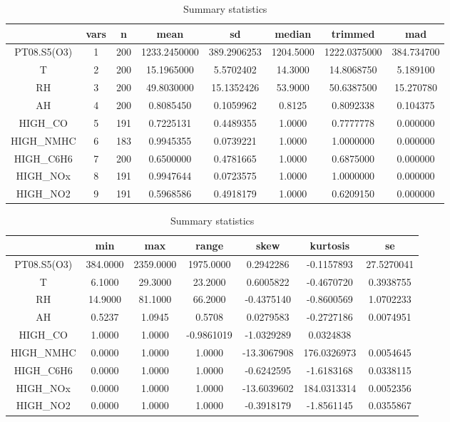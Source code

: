 \begin{table}[h]
  \centering
  \begin{tabular}{|c|c|c|c|c|c|c|c|}
    \hline
    & vars & n & mean & sd & median & trimmed & mad\\
    \hline
    PT08.S5(O3) & 1 & 200 & 1233.2450000 & 389.2906253 & 1204.5000 & 1222.0375000 & 384.734700\\
    \hline
    T & 2 & 200 & 15.1965000 & 5.5702402 & 14.3000 & 14.8068750 & 5.189100\\
    \hline
    RH & 3 & 200 & 49.8030000 & 15.1352426 & 53.9000 & 50.6387500 & 15.270780\\
    \hline
    AH & 4 & 200 & 0.8085450 & 0.1059962 & 0.8125 & 0.8092338 & 0.104375\\
    \hline
    HIGH\_CO & 5 & 191 & 0.7225131 & 0.4489355 & 1.0000 & 0.7777778 & 0.000000\\
    \hline
    HIGH\_NMHC & 6 & 183 & 0.9945355 & 0.0739221 & 1.0000 & 1.0000000 & 0.000000\\
    \hline
    HIGH\_C6H6 & 7 & 200 & 0.6500000 & 0.4781665 & 1.0000 & 0.6875000 & 0.000000\\
    \hline
    HIGH\_NOx & 8 & 191 & 0.9947644 & 0.0723575 & 1.0000 & 1.0000000 & 0.000000\\
    \hline
    HIGH\_NO2 & 9 & 191 & 0.5968586 & 0.4918179 & 1.0000 & 0.6209150 & 0.000000\\
    \hline
  \end{tabular}
  
  \begin{tabular}{|c|c|c|c|c|c|c|}
    \hline
    & min & max & range & skew & kurtosis & se\\
    \hline
    PT08.S5(O3) & 384.0000 & 2359.0000 & 1975.0000 & 0.2942286 & -0.1157893 & 27.5270041\\
    \hline
    T & 6.1000 & 29.3000 & 23.2000 & 0.6005822 & -0.4670720 & 0.3938755\\
    \hline
    RH & 14.9000 & 81.1000 & 66.2000 & -0.4375140 & -0.8600569 & 1.0702233\\
    \hline
    AH & 0.5237 & 1.0945 & 0.5708 & 0.0279583 & -0.2727186 & 0.0074951\\
    \hline
    HIGH\_CO  & 1.0000 & 1.0000 & -0.9861019 & -1.0329289 & 0.0324838\\
    \hline
    HIGH\_NMHC & 0.0000 & 1.0000 & 1.0000 & -13.3067908 & 176.0326973 & 0.0054645\\
    \hline
    HIGH\_C6H6 & 0.0000 & 1.0000 & 1.0000 & -0.6242595 & -1.6183168 & 0.0338115\\
    \hline
    HIGH\_NOx & 0.0000 & 1.0000 & 1.0000 & -13.6039602 & 184.0313314 & 0.0052356\\
    \hline
    HIGH\_NO2 & 0.0000 & 1.0000 & 1.0000 & -0.3918179 & -1.8561145 & 0.0355867\\
    \hline
  \end{tabular}  

  \caption{Summary statistics}
\end{table}
